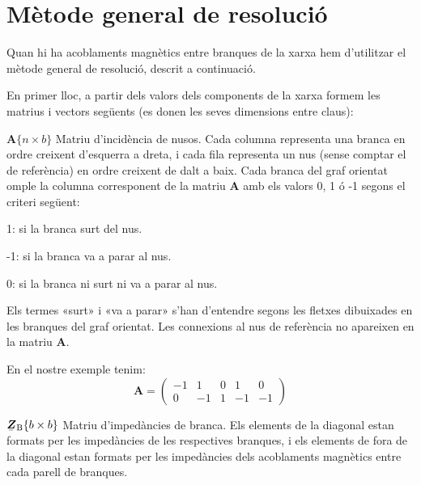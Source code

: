 \section{Mètode general de resolució}

Quan hi ha acoblaments
magnètics entre branques de la xarxa hem d'utilitzar el mètode
general de resolució, descrit a continuació.

En primer lloc, a partir dels valors dels components de la xarxa formem les matrius i vectors següents (es donen les seves dimensions entre claus):
\begin{list}{}
{\setlength{\labelwidth}{20mm} \setlength{\leftmargin}{22mm} \setlength{\labelsep}{2mm}}
   \item[$\boldsymbol{A}\{n\times b\}$] Matriu d'incidència de nusos. Cada columna representa una branca en ordre creixent d'esquerra a dreta, i cada fila representa un nus (sense comptar el de referència) en ordre creixent de dalt a baix. Cada branca del graf orientat omple la columna corresponent de la matriu $\boldsymbol{A}$ amb els valors 0, 1 ó -1 segons el criteri següent:
   \begin{list}{}
   {\setlength{\labelwidth}{7mm} \setlength{\leftmargin}{9mm} \setlength{\labelsep}{2mm}}
      \item[1:]  si la branca surt del nus.
      \item[-1:] si la branca va a parar al nus.
      \item[0:]  si la branca ni surt ni va a parar al nus.
   \end{list}
   Els termes «surt» i «va a parar» s'han d'entendre segons les fletxes dibuixades en les branques del graf orientat. Les connexions al nus de referència no apareixen en la matriu $\boldsymbol{A}$.

   En el nostre exemple tenim:
   \[
      \boldsymbol{A} = \left(\begin{array}{rrrrr} -1 & 1  & 0 &  1 & 0 \\  0 & -1 & 1 & -1 & -1
                   \end{array} \right)
   \]

   \item[$\mcmplx{Z}\ped{B}\{b\times b\}$] Matriu d'impedàncies de branca. Els elements de la diagonal estan formats per les impedàncies de les respectives branques, i els elements de fora de la diagonal estan formats per les impedàncies dels acoblaments magnètics entre cada parell de branques.


\end{list}
